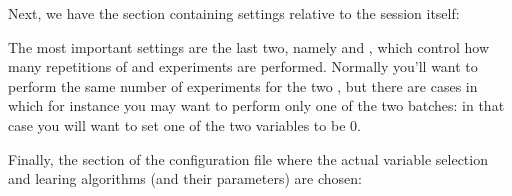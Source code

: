 \documentclass[letterpaper,10pt,english]{sphinxmanual}
\begin{document}
Next, we have the section containing settings relative to the session itself:

\begin{sphinxVerbatim}[commandchars=\\\{\}]
  

  

  

  
\end{sphinxVerbatim}

The most important settings are the last two, namely  and , which control how many repetitions of  and  experiments are performed.
Normally you'll want to perform the same number of experiments for the two , but there are cases in which for instance you may want to perform only one of the two batches: in that case you will want to set one of the two variables to be 0.

Finally, the section of the configuration file where the actual variable selection and learing algorithms (and their parameters) are chosen:
\end{document}
